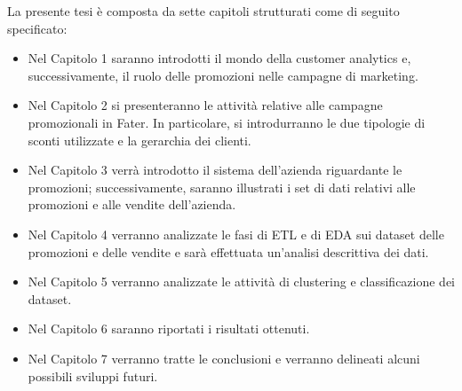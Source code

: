 La presente tesi è composta da sette capitoli strutturati come di seguito specificato:
\begin{itemize}
	\item Nel Capitolo 1 saranno introdotti il mondo della customer analytics e, successivamente, il ruolo delle promozioni nelle campagne di marketing.
	\item Nel Capitolo 2 si presenteranno le attività relative alle campagne promozionali in Fater. In particolare, si introdurranno le due tipologie di sconti utilizzate e la gerarchia dei clienti.
	\item Nel Capitolo 3 verrà introdotto il sistema dell'azienda riguardante le promozioni; successivamente, saranno illustrati i set di dati relativi alle promozioni e alle vendite dell'azienda.
	\item Nel Capitolo 4 verranno analizzate le fasi di ETL e di EDA sui dataset delle promozioni e delle vendite e sarà effettuata un'analisi descrittiva dei dati.
	\item Nel Capitolo 5 verranno analizzate le attività di clustering e classificazione dei dataset.
	\item Nel Capitolo 6 saranno riportati i risultati ottenuti.
	\item Nel Capitolo 7 verranno tratte le conclusioni e verranno delineati alcuni possibili sviluppi futuri.
	
\end{itemize}
